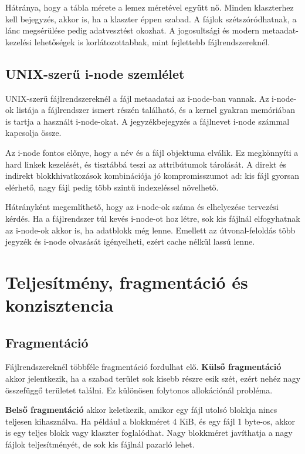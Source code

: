 Hátránya, hogy a tábla mérete a lemez méretével együtt nő. Minden klaszterhez kell bejegyzés, akkor is, ha a klaszter éppen szabad. A fájlok szétszóródhatnak, a lánc megsérülése pedig adatvesztést okozhat. A jogosultsági és modern metaadat-kezelési lehetőségek is korlátozottabbak, mint fejlettebb fájlrendszereknél.

\subsection{UNIX-szerű i-node szemlélet}

UNIX-szerű fájlrendszereknél a fájl metaadatai az i-node-ban vannak. Az i-node-ok listája a fájlrendszer ismert részén található, és a kernel gyakran memóriában is tartja a használt i-node-okat. A jegyzékbejegyzés a fájlnevet i-node számmal kapcsolja össze.

Az i-node fontos előnye, hogy a név és a fájl objektuma elválik. Ez megkönnyíti a hard linkek kezelését, és tisztábbá teszi az attribútumok tárolását. A direkt és indirekt blokkhivatkozások kombinációja jó kompromisszumot ad: kis fájl gyorsan elérhető, nagy fájl pedig több szintű indexeléssel növelhető.

Hátrányként megemlíthető, hogy az i-node-ok száma és elhelyezése tervezési kérdés. Ha a fájlrendszer túl kevés i-node-ot hoz létre, sok kis fájlnál elfogyhatnak az i-node-ok akkor is, ha adatblokk még lenne. Emellett az útvonal-feloldás több jegyzék és i-node olvasását igényelheti, ezért cache nélkül lassú lenne.

\section{Teljesítmény, fragmentáció és konzisztencia}

\subsection{Fragmentáció}

Fájlrendszereknél többféle fragmentáció fordulhat elő. \textbf{Külső fragmentáció} akkor jelentkezik, ha a szabad terület sok kisebb részre esik szét, ezért nehéz nagy összefüggő területet találni. Ez különösen folytonos allokációnál probléma.

\textbf{Belső fragmentáció} akkor keletkezik, amikor egy fájl utolsó blokkja nincs teljesen kihasználva. Ha például a blokkméret 4 KiB, és egy fájl 1 byte-os, akkor is egy teljes blokk vagy klaszter foglalódhat. Nagy blokkméret javíthatja a nagy fájlok teljesítményét, de sok kis fájlnál pazarló lehet.

